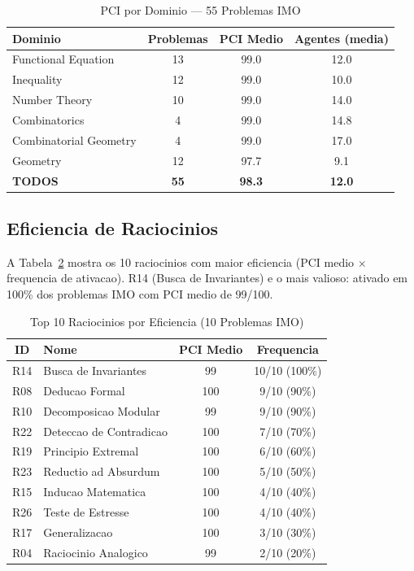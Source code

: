 \documentclass[5p]{elsarticle}
\newcommand{\tabfootnotesize}{\fontsize{9}{11}\selectfont}
\begin{document}
\begin{table}[H]
\centering
\caption{PCI por Dominio — 55 Problemas IMO}
\label{tab:imo_dominios}
\tabfootnotesize
\begin{tabular}{l c c c}
\toprule
\textbf{Dominio} & \textbf{Problemas} & \textbf{PCI Medio} & \textbf{Agentes (media)}\\
\midrule
Functional Equation & 13 & 99.0 & 12.0\\
Inequality & 12 & 99.0 & 10.0\\
Number Theory & 10 & 99.0 & 14.0\\
Combinatorics & 4 & 99.0 & 14.8\\
Combinatorial Geometry & 4 & 99.0 & 17.0\\
Geometry & 12 & 97.7 & 9.1\\
\midrule
\textbf{TODOS} & \textbf{55} & \textbf{98.3} & \textbf{12.0}\\
\bottomrule
\end{tabular}
\end{table}

\subsection{Eficiencia de Raciocinios}

A Tabela~\ref{tab:eficiencia} mostra os 10 raciocinios com maior eficiencia
(PCI medio $\times$ frequencia de ativacao). R14 (Busca de Invariantes) e
o mais valioso: ativado em 100\% dos problemas IMO com PCI medio de 99/100.

\begin{table}[H]
\centering
\caption{Top 10 Raciocinios por Eficiencia (10 Problemas IMO)}
\label{tab:eficiencia}
\tabfootnotesize
\begin{tabular}{c p{3cm} c c}
\toprule
\textbf{ID} & \textbf{Nome} & \textbf{PCI Medio} & \textbf{Frequencia}\\
\midrule
R14 & Busca de Invariantes & 99 & 10/10 (100\%)\\
R08 & Deducao Formal & 100 & 9/10 (90\%)\\
R10 & Decomposicao Modular & 99 & 9/10 (90\%)\\
R22 & Deteccao de Contradicao & 100 & 7/10 (70\%)\\
R19 & Principio Extremal & 100 & 6/10 (60\%)\\
R23 & Reductio ad Absurdum & 100 & 5/10 (50\%)\\
R15 & Inducao Matematica & 100 & 4/10 (40\%)\\
R26 & Teste de Estresse & 100 & 4/10 (40\%)\\
R17 & Generalizacao & 100 & 3/10 (30\%)\\
R04 & Raciocinio Analogico & 99 & 2/10 (20\%)\\
\bottomrule
\end{tabular}
\end{table}
\end{document}
